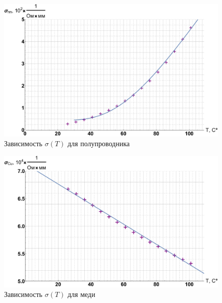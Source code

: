 \documentclass[12pt]{kiarticle} %
\begin{document}
	
		\begin{figure}[h]
		\label{graf_pp}
		\includegraphics[scale=0.47]{pp.pdf}
		\caption{Зависимость $ \sigma(T) $ для полупроводника}
	\end{figure}
	
		\begin{figure}[h]
		\includegraphics[scale=0.47]{cu.pdf}
		\caption{Зависимость $ \sigma(T) $ для меди}
				\label{graf_cu}
	\end{figure}
\end{document}
